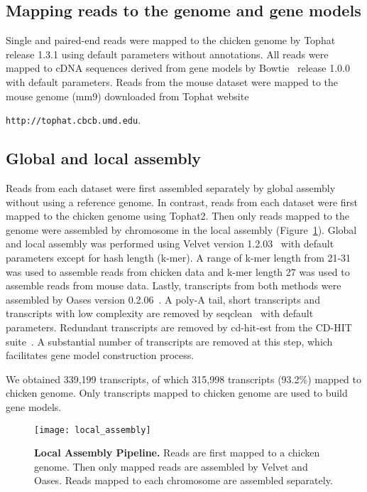\subsection{Mapping reads to the genome and gene models}

Single and paired-end reads were mapped to the chicken genome by
Tophat~\cite{Trapnell:2009dp} release 1.3.1 using default
parameters without annotations.  All reads were mapped to cDNA
sequences derived from gene models by
Bowtie~\cite{Langmead:2009fv} release 1.0.0 with default
parameters.  Reads from the mouse dataset were mapped to the
mouse genome (mm9) downloaded from Tophat website

\texttt{http://tophat.cbcb.umd.edu}.

\subsection{Global and local assembly}

Reads from each dataset were first assembled separately by global assembly
without using a reference genome.  In contrast, reads from each dataset were
first mapped to the chicken genome using Tophat2.  Then only reads mapped to
the genome were assembled by chromosome in the local assembly
(Figure~\ref{local_assembly}).  Global and local assembly was performed using
Velvet version 1.2.03~\cite{Zerbino:2008vu} with default parameters except for
hash length (k-mer).  A range of k-mer length from 21-31 was used to assemble
reads from chicken data and k-mer length 27 was used to assemble reads from
mouse data.  Lastly, transcripts from both methods were assembled by Oases
version 0.2.06~\cite{Schulz:2012je}.  A poly-A tail, short transcripts and
transcripts with low complexity are removed by seqclean~\cite{seqclean} with
default parameters.  Redundant transcripts are removed by cd-hit-est from the
CD-HIT suite~\cite{Li:2006hr}.  A substantial number of transcripts are removed
at this step, which facilitates gene model construction process.

We obtained 339,199 transcripts, of which 315,998 transcripts (93.2\%) mapped
to chicken genome.  Only transcripts mapped to chicken genome are used to build
gene models.

\begin{figure}[!ht]
\begin{center}
\texttt{[image: local\_assembly]}
\end{center}
\caption{
\textbf{Local Assembly Pipeline.}
Reads are first mapped to a chicken genome.  Then only mapped reads are
assembled by Velvet and Oases. Reads mapped to each chromosome
are assembled separately.
}
\label{local_assembly}
\end{figure}

